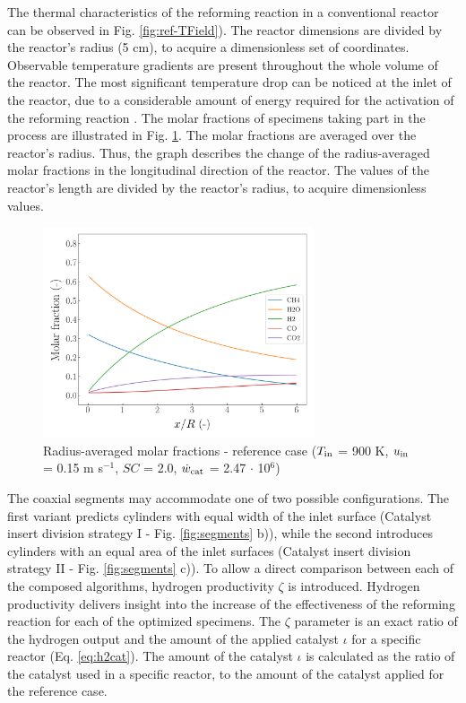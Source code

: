 \documentclass[preprint,12pt]{elsarticle}
\begin{document}
The thermal characteristics of the reforming reaction in a conventional reactor can be observed in Fig. \ref{fig:ref-TField}). The reactor dimensions are divided by the reactor's radius (5 cm), to acquire a dimensionless set of coordinates. Observable temperature gradients are present throughout the whole volume of the reactor. The most significant temperature drop can be noticed at the inlet of the reactor, due to a considerable amount of energy required for the activation of the reforming reaction \cite{Xu1989, Pajak2018}. The molar fractions of specimens taking part in the process are illustrated in Fig. \ref{fig:ref-avg}. The molar fractions are averaged over the reactor's radius. Thus, the graph describes the change of the radius-averaged molar fractions in the longitudinal direction of the reactor. The values of the reactor's length are divided by the reactor's radius, to acquire dimensionless values.  

\begin{figure}[h]
\centering
\includegraphics[width=80mm]{ref-avg.png}
\caption{\label{fig:ref-avg} Radius-averaged molar fractions - reference case ($T_{\rm{in}}$ = 900 K, $u_{\rm{in}}$ = 0.15 m s$^{-1}$, $SC$ = 2.0, $\dot{w}_{\rm{cat}}$ = 2.47 $\cdot$ 10$^{6}$)}
\end{figure}

The coaxial segments may accommodate one of two possible configurations. The first variant predicts cylinders with equal width of the inlet surface (Catalyst insert division strategy I - Fig. \ref{fig:segments} b)), while the second introduces cylinders with an equal area of the inlet surfaces (Catalyst insert division strategy II - Fig. \ref{fig:segments} c)). To allow a direct comparison between each of the composed algorithms, hydrogen productivity $\zeta$ is introduced. Hydrogen productivity delivers insight into the increase of the effectiveness of the reforming reaction for each of the optimized specimens. The $\zeta$ parameter is an exact ratio of the hydrogen output and the amount of the applied catalyst $\iota$  for a specific reactor (Eq. \eqref{eq:h2cat}).  The amount of the catalyst $\iota$ is calculated as the ratio of the catalyst used in a specific reactor, to the amount of the catalyst applied for the reference case.
 
\end{document}
